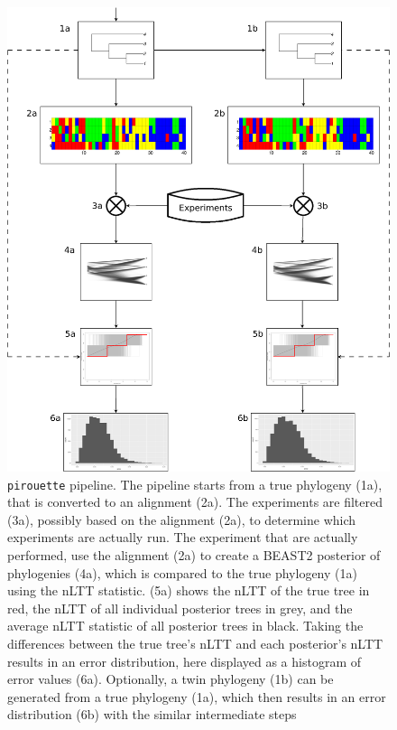 \documentclass{article}
\begin{document}
\begin{figure}
  \centering
  \includegraphics[width=\textwidth]{workflow.png}
  \caption{
    \texttt{pirouette} pipeline. 
    The pipeline starts from a true phylogeny (1a), 
    that is converted to an alignment (2a).
    The experiments are filtered (3a), possibly based on the
    alignment (2a), to determine which experiments are actually run.
    The experiment that are actually performed, use the 
    alignment (2a) to create a BEAST2 posterior of phylogenies (4a),
    which is compared to the true phylogeny (1a) 
    using the nLTT statistic. (5a) shows the nLTT of the true tree in red,
    the nLTT of all individual posterior trees in grey, and the average
    nLTT statistic of all posterior trees in black.
    Taking the differences between the true tree's nLTT and each posterior's
    nLTT results in an error distribution, here displayed as a histogram
    of error values (6a).
    Optionally, a twin phylogeny (1b) can be generated from a true
    phylogeny (1a), which then results in an error distribution (6b) with
    the similar intermediate steps 
  }
  \label{fig:pipeline}
\end{figure}
\end{document}
